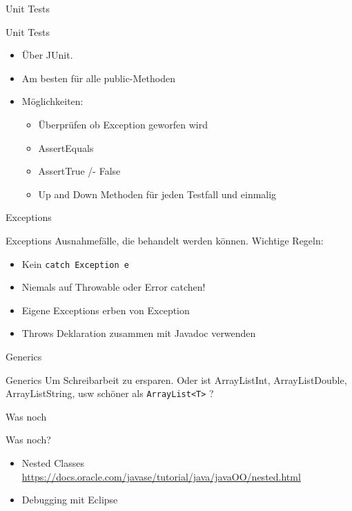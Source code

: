\documentclass[18pt]{beamer}
\begin{document}
\begin{section}{Unit Tests} 

\begin{frame}{Unit Tests}
\pause
\begin{itemize}
 \item Über JUnit.
 \item Am besten für alle public-Methoden
 \item Möglichkeiten: \begin{itemize}
        \item Überprüfen ob Exception geworfen wird
        \item AssertEquals
        \item AssertTrue /- False
        \item Up and Down Methoden für jeden Testfall und einmalig
       \end{itemize}
\end{itemize}
\end{frame}
\end{section}


\begin{section}{Exceptions} 
\begin{frame}[fragile]{Exceptions}
Ausnahmefälle, die behandelt werden können.
Wichtige Regeln:
\begin{itemize}
 \item Kein \verb|catch Exception e|
 \item Niemals auf Throwable oder Error catchen!
 \item Eigene Exceptions erben von Exception
 \item Throws Deklaration zusammen mit Javadoc verwenden
\end{itemize}

\end{frame}
\end{section}



\begin{section}{Generics} 
\begin{frame}[fragile]{Generics}
 Um Schreibarbeit zu ersparen.
 Oder ist ArrayListInt, ArrayListDouble, ArrayListString, usw schöner als \verb|ArrayList<T>| ?
\end{frame}
\end{section}



\begin{section}{Was noch} 
\begin{frame}{Was noch?}
\begin{itemize}
 \item Nested Classes \url{https://docs.oracle.com/javase/tutorial/java/javaOO/nested.html}
 \item Debugging mit Eclipse
\end{itemize}
 
\end{frame}
\end{section}
\end{document}
